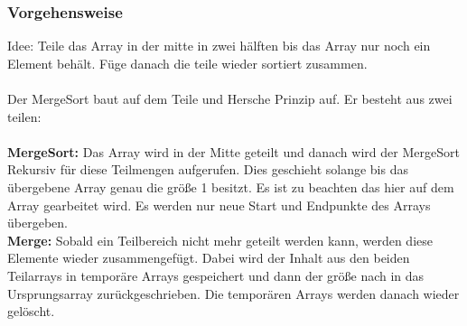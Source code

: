 \documentclass{article}
\begin{document}
\subsubsection{Vorgehensweise}
Idee: Teile das Array in der mitte in zwei hälften bis das Array nur noch ein Element behält. Füge danach die teile wieder sortiert zusammen. \\
\\
Der MergeSort baut auf dem Teile und Hersche Prinzip auf. Er besteht aus zwei teilen:
\\ \\
\textbf{MergeSort:} Das Array wird in der Mitte geteilt und danach wird der MergeSort Rekursiv für diese Teilmengen aufgerufen. Dies geschieht solange bis das übergebene Array genau die größe 1 besitzt. Es ist zu beachten das hier auf dem Array gearbeitet wird. Es werden nur neue Start und Endpunkte des Arrays übergeben. \\
\textbf{Merge: } Sobald ein Teilbereich nicht mehr geteilt werden kann, werden diese Elemente wieder zusammengefügt. Dabei wird der Inhalt aus den beiden Teilarrays in temporäre Arrays gespeichert und dann der größe nach in das Ursprungsarray zurückgeschrieben. Die temporären Arrays werden danach wieder gelöscht. 
\end{document}
